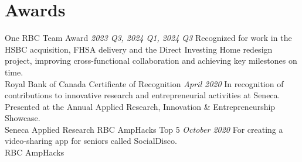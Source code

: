 \documentclass[letterpaper]{moderncv}
\begin{document}
\section{Awards}
\cventry
{}
{One RBC Team Award}
{}
{\textit{2023 Q3, 2024 Q1, 2024 Q3}}
{}
{Recognized for work in the HSBC acquisition, FHSA delivery and the Direct Investing Home redesign project, improving cross-functional collaboration and achieving key milestones on time.\\Royal Bank of Canada}
\vspace{1mm}
\cventry
{}
{Certificate of Recognition}
{}
{\textit{April 2020}}
{}
{In recognition of contributions to innovative research and entrepreneurial activities at Seneca. Presented at the Annual Applied Research, Innovation \& Entrepreneurship Showcase.\\Seneca Applied Research}
\vspace{1mm}
\cventry
{}
{RBC AmpHacks Top 5}
{}
{\textit{October 2020}}
{}
{For creating a video-sharing app for seniors called SocialDisco.\\RBC AmpHacks}
\vspace{1mm}
\ 
\end{document}
